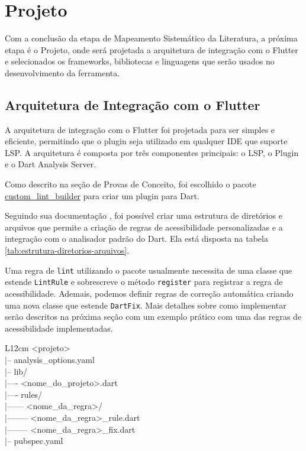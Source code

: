 \section{Projeto}

Com a conclusão da etapa de Mapeamento Sistemático da Literatura, a próxima etapa é o Projeto, onde será projetada a arquitetura de integração com o Flutter e selecionados os frameworks, bibliotecas e linguagens que serão usados no desenvolvimento da ferramenta.

\subsection{Arquitetura de Integração com o Flutter}

A arquitetura de integração com o Flutter foi projetada para ser simples e eficiente, permitindo que o plugin seja utilizado em qualquer IDE que suporte LSP. A arquitetura é composta por três componentes principais: o LSP, o Plugin e o Dart Analysis Server.

Como descrito na seção de Provas de Conceito, foi escolhido o pacote \href{https://pub.dev/packages/custom_lint_builder}{custom\_lint\_builder} para criar um plugin para Dart.

Seguindo sua documentação \cite{customlintbuilder}, foi possível criar uma estrutura de diretórios e arquivos que permite a criação de regras de acessibilidade personalizadas e a integração com o analisador padrão do Dart. Ela está disposta na tabela  \ref{tab:estrutura-diretorios-arquivos}.

Uma regra de \texttt{lint} utilizando o pacote usualmente necessita de uma classe que estende \texttt{LintRule} e sobrescreve o método \texttt{register} para registrar a regra de acessibilidade. Ademais, podemos definir regras de correção automática criando uma nova classe que estende \texttt{DartFix}. Mais detalhes sobre como implementar serão descritos na próxima seção com um exemplo prático com uma das regras de acessibilidade implementadas.

\begin{table}[!htbp]
	\centering
	\renewcommand{\arraystretch}{1.1}
	\caption{Estrutura de diretórios e arquivos do projeto}
	\label{tab:estrutura-diretorios-arquivos}
	\ttfamily
	\begin{tabular}{ L{12cm} }
		\hline
		<projeto> \\
		|-- analysis\_options.yaml \\
		|-- lib/ \\
		|---- <nome\_do\_projeto>.dart \\
		|---- rules/ \\
		|------ <nome\_da\_regra>/ \\
		|-------- <nome\_da\_regra>\_rule.dart \\
		|-------- <nome\_da\_regra>\_fix.dart \\
		|-- pubspec.yaml \\
		\hline
	\end{tabular}
	\fontfamily{\rmdefault}\selectfont
	\vspace{2mm}
\end{table}

